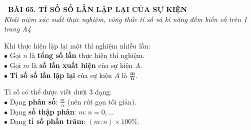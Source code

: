 \documentclass[14pt,a4paper,oneside]{extbook}
\begin{document}
\noindent
\begin{tcolorbox}[
  enhanced,
  colback=teal!8!white,
  colframe=teal!80!black,
  arc=3mm,
  boxrule=1.1pt,
  width=\linewidth,
  halign=center,
  top=2.2mm, bottom=2.2mm,
  left=3mm, right=3mm,
  drop fuzzy shadow
]
  {\large\bfseries\color{teal!95!black}\faBookmark\ BÀI 65. TỈ SỐ SỐ LẦN LẶP LẠI CỦA SỰ KIỆN}\\[2pt]
  {\scriptsize\color{black!75}\itshape Khái niệm xác suất thực nghiệm, công thức tỉ số và kĩ năng đếm biến cố trên 1 trang A4}
\end{tcolorbox}

\vspace{3.2mm}
\noindent
\begin{minipage}[t]{0.54\textwidth}
  \begin{tcolorbox}[
    enhanced,
    title={\footnotesize\bfseries\color{white}\faCubes\ 1. Khái niệm Xác suất thực nghiệm},
    colback=blue!2!white,
    colframe=blue!75!black,
    arc=2.5mm, boxrule=0.8pt, top=1.8mm, bottom=1.8mm, left=2.2mm, right=2.2mm
  ]
    \footnotesize
    Khi thực hiện lặp lại một thí nghiệm nhiều lần:\\
    $\bullet$ Gọi $n$ là \textbf{tổng số lần} thực hiện thí nghiệm.\\
    $\bullet$ Gọi $m$ là \textbf{số lần xuất hiện} của sự kiện $A$.\\
    $\bullet$ \textbf{Tỉ số số lần lặp lại} của sự kiện $A$ là $\mathbf{\frac{m}{n}}$.
  \end{tcolorbox}
\end{minipage}%
\hfill
\begin{minipage}[t]{0.44\textwidth}
  \begin{tcolorbox}[
    enhanced,
    title={\footnotesize\bfseries\color{white}\faExchange\ 2. Biểu diễn tỉ số},
    colback=teal!2!white,
    colframe=teal!75!black,
    arc=2.5mm, boxrule=0.8pt, top=1.8mm, bottom=1.8mm, left=2mm, right=2mm
  ]
    \footnotesize
    Tỉ số có thể được viết dưới 3 dạng:\\
    $\bullet$ Dạng \textbf{phân số}: $\frac{m}{n}$ (nên rút gọn tối giản).\\
    $\bullet$ Dạng \textbf{số thập phân}: $m : n = 0,...$\\
    $\bullet$ Dạng \textbf{tỉ số phần trăm}: $(m : n) \times 100\%$.
  \end{tcolorbox}
\end{minipage}

\vspace{3mm}
\end{document}
